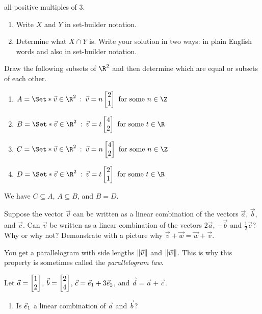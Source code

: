 \begin{exercises}
\begin{problist}
			all positive multiples of $3$.
			\begin{enumerate}
				\item Write $X$ and $Y$ in set-builder notation.
				\item Determine what $X\cap Y$ is. Write your solution in two ways: in
					plain English words and also in set-builder notation.
			\end{enumerate}
		\prob
			Draw the following subsets of $\R^2$ and then determine which are equal or
			subsets of each other.
			\begin{enumerate}
				\item $A=\Set*{\vec v\in\R^2\given \vec v=n\mat{2\\1} \text{ for some }n\in\Z}$
				\item $B=\Set*{\vec v\in\R^2\given \vec v=t\mat{4\\2}\text{ for some }t\in\R}$
				\item $C=\Set*{\vec v\in\R^2\given \vec v=n\mat{4\\2} \text{ for some }n\in\Z}$
				\item $D=\Set*{\vec v\in\R^2\given \vec v=t\mat{2\\1}\text{ for some }t\in\R}$
			\end{enumerate}
			\begin{solution}
				We have $C\subseteq A$, $A\subseteq B$, and $B=D$.
			\end{solution}
		\prob
			Suppose the vector $\vec v$ can be written as a linear combination of the
			vectors $\vec a$, $\vec b$, and $\vec c$. Can $\vec v$ be written as a
			linear combination of the vectors $2\vec a$, $-\vec b$ and
			$\frac12\vec c$? Why or why not?
		\prob
			Demonstrate with a picture why $\vec v + \vec w = \vec w + \vec v$.
			\begin{solution}
				You get a parallelogram with side lengths $\lVert\vec v\rVert$ and
				$\lVert\vec w\rVert$. This is why this property is sometimes called the
				\emph{parallelogram law}.
			\end{solution}
		\prob Let $\vec a=\mat{1\\2}$, $\vec b=\mat{2\\4}$, $\vec c={\vec e_1}+3{\vec e_2}$, and $\vec d=\vec a+\vec c$.
		\begin{enumerate}
			\item Is ${\vec e_1}$ a linear combination of $\vec a$ and $\vec b$?

\end{enumerate}
\end{problist}
\end{exercises}
